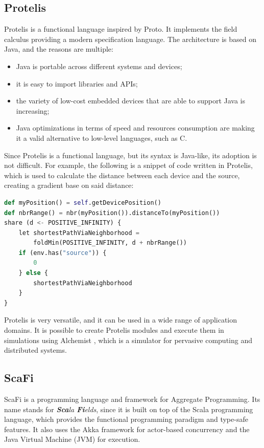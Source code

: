 \subsection{Protelis}\label{subsection:protelis}
Protelis \cite{protelis_introduction} is a functional language inspired by Proto. It implements the field calculus providing a modern specification language.\newline
The architecture is based on Java, and the reasons are multiple:
\begin{itemize}
    \item Java is portable across different systems and devices;
    \item it is easy to import libraries and APIs;
    \item the variety of low-cost embedded devices that are able to support Java is increasing;
    \item Java optimizations in terms of speed and resources consumption are making it a valid alternative to low-level languages, such as C.
\end{itemize}

Since Protelis is a functional language, but its syntax is Java-like, its adoption is not difficult. For example, the following is a snippet of code written in Protelis, which is used to calculate the distance between each device and the source, creating a gradient base on said distance:
\begin{lstlisting}[language=Python, caption=Protelis example, captionpos=b]
def myPosition() = self.getDevicePosition()
def nbrRange() = nbr(myPosition()).distanceTo(myPosition())
share (d <- POSITIVE_INFINITY) {
    let shortestPathViaNeighborhood = 
        foldMin(POSITIVE_INFINITY, d + nbrRange())
    if (env.has("source")) { 
        0 
    } else {
        shortestPathViaNeighborhood
    }
}
\end{lstlisting}

Protelis is very versatile, and it can be used in a wide range of application domains. It is possible to create Protelis modules and execute them in simulations using Alchemist \cite{alchemist}, which is a simulator for pervasive computing and distributed systems.

\subsection{ScaFi}\label{subsection:scafi}
ScaFi \cite{scafi_introduction} is a programming language and framework for Aggregate Programming. Its name stands for \textit{\textbf{Sca}la \textbf{Fi}elds}, since it is built on top of the Scala programming language, which provides the functional programming paradigm and type-safe features. It also uses the Akka framework for actor-based concurrency and the Java Virtual Machine (JVM) for execution.


